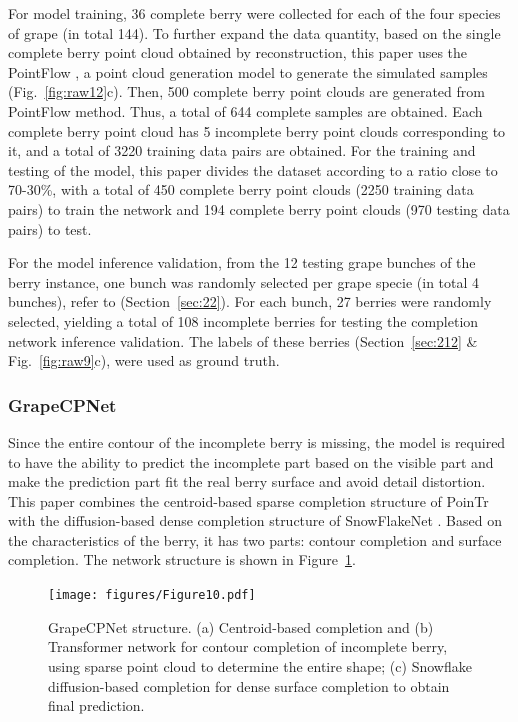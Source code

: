 \documentclass[12pt]{article}
\begin{document}
For model training, 36 complete berry were collected for each of the four species of grape (in total 144). 
To further expand the data quantity, based on the single complete berry point cloud obtained by reconstruction, this paper uses the PointFlow \citep{yang_pointflow_2019}, a point cloud generation model to generate the simulated samples (Fig.~\ref{fig:raw12}c). 
Then, 500 complete berry point clouds are generated from PointFlow method. 
Thus, a total of 644 complete samples are obtained. 
Each complete berry point cloud has 5 incomplete berry point clouds corresponding to it, and a total of 3220 training data pairs are obtained. 
For the training and testing of the model, this paper divides the dataset according to a ratio close to 70-30\%, with a total of 450 complete berry point clouds (2250 training data pairs) to train the network and 194 complete berry point clouds (970 testing data pairs) to test.

For the model inference validation, from the 12 testing grape bunches of the berry instance,  one bunch was randomly selected per grape specie (in total 4 bunches), refer to (Section~\ref{sec:22}). 
For each bunch, 27 berries were randomly selected, yielding a total of 108 incomplete berries for testing the completion network inference validation. 
The labels of these berries (Section~\ref{sec:212} \& Fig.~\ref{fig:raw9}c), were used as ground truth.

\subsubsection{GrapeCPNet}

Since the entire contour of the incomplete berry is missing, the model is required to have the ability to predict the incomplete part based on the visible part and make the prediction part fit the real berry surface and avoid detail distortion. 
This paper combines the centroid-based sparse completion structure of PoinTr \citep{yu_pointr_2021} with the diffusion-based dense completion structure of SnowFlakeNet \citep{xiang_snowflakenet_2021}. 
Based on the characteristics of the berry, it has two parts: contour completion and surface completion. The network structure is shown in Figure~\ref{fig:raw5}.

\begin{figure}[hbt!]
    \centering
    \texttt{[image: figures/Figure10.pdf]}
    \caption{GrapeCPNet structure. (a) Centroid-based completion and (b) Transformer network for contour completion of incomplete berry, using sparse point cloud to determine the entire shape; (c) Snowflake diffusion-based completion for dense surface completion to obtain final prediction.}
    \label{fig:raw5}
\end{figure}
\end{document}
